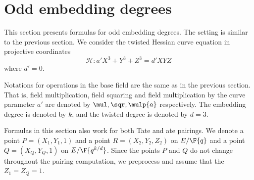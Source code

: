 \section{Odd embedding degrees}
\label{sec:odd}

This section presents formulas for odd embedding degrees.
The setting is similar to the previous section.
We consider
the twisted Hessian curve equation in projective coordinates
$$ \mathcal{H}: a' X^3 + Y^3 + Z^3 = d' X Y Z$$
where $d' = 0$.

Notations for operations in the base field are the same as in the previous section.
That is,
field multiplication, field squaring and field multiplication by the curve parameter $a'$
are denoted
by $\mul, \sqr, \mulp{a}$ respectively.
The embedding degree is denoted by $k$, and the twisted degree is denoted by $d=3$.

Formulas in this section also work for both Tate and ate pairings.
We denote a point $P = (X_1,Y_1,1)$ and a point $R = (X_2,Y_2,Z_2)$ on $E/\F{q}$
and a point $Q = (X_{Q},Y_{Q},1)$ on $E/\F{q^{k/d}}$.
Since the points $P$ and $Q$ do not change throughout the pairing computation,
we preprocess and assume that the $Z_1 = Z_{Q} = 1$.





